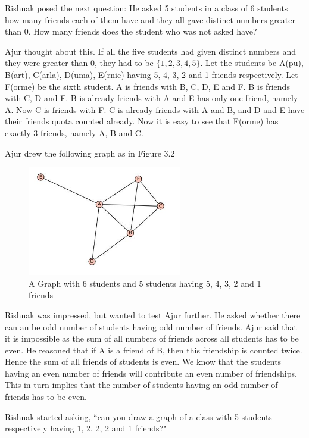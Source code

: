Rishnak posed the next question: He asked 5 students in a class of 6 students how many friends each of them have and they all gave distinct numbers greater than 0. How many friends does the student who was not asked have?

Ajur thought about this. If all the five students had given distinct numbers and they were greater than 0, they had to be $\{1,2,3,4,5\}$. Let the students be A(pu), B(art), C(arla), D(uma), E(rnie) having 5, 4, 3, 2 and 1 friends respectively. Let F(orme) be the sixth student. A is friends with B, C, D, E and F. B is friends with C, D and F. B is already friends with A and E has only one friend, namely A. Now C is friends with F. C is already friends with A and B, and D and E have their friends quota counted already. 
Now it is easy to see that F(orme) has exactly 3 friends, namely A, B and C.

Ajur drew the following graph as in Figure 3.2

\begin{figure}
\includegraphics[width=0.6\textwidth]{graphstory1-1.JPG}
\caption{A Graph with 6 students and 5 students having 5, 4, 3, 2 and 1 friends}
\end{figure}

Rishnak was impressed, but wanted to test Ajur further. He asked whether there can an be odd number of students having odd number of friends. Ajur said that it is impossible as the sum of all numbers of friends across all students has to be even. He reasoned that if A is a friend of B, then this friendship is counted twice. Hence the sum of all friends of students is even. We know that the students having an even number of friends will contribute an even number of friendships. This in turn implies that the number of students having an odd number of friends has to be even.


Rishnak started asking, ``can you draw a graph of a class with 5 students respectively having 1, 2, 2, 2 and 1 friends?"

